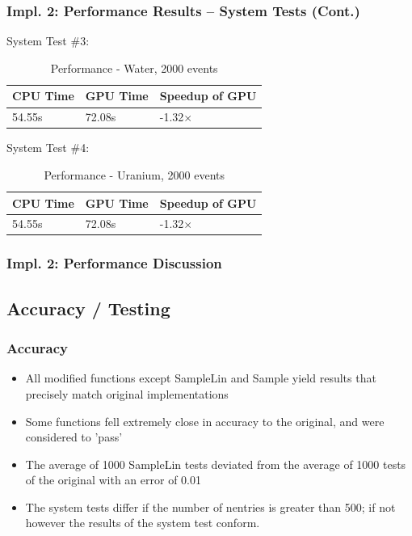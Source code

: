 \documentclass{beamer}
\begin{document}
\begin{frame}
\frametitle{Impl. 2: Performance Results -- System Tests (Cont.)}
System Test \#3:
\begin{table}
	\begin{tabular}{lll}
	\toprule
	\bf CPU Time&\bf  GPU Time&\bf Speedup of GPU\\\midrule
	54.55s&72.08s&-1.32$\times$\\\bottomrule
	\end{tabular}
	\caption{Performance - Water, 2000 events}
\end{table}
System Test \#4:
\begin{table}
	\begin{tabular}{lll}
	\toprule
	\bf CPU Time&\bf  GPU Time&\bf Speedup of GPU\\\midrule
	54.55s&72.08s&-1.32$\times$\\\bottomrule
	\end{tabular}
	\caption{Performance - Uranium, 2000 events}
\end{table}
\end{frame}

\begin{frame}
\frametitle{Impl. 2: Performance Discussion}
\end{frame}

\subsection{Accuracy / Testing}
\begin{frame}
\frametitle{Accuracy}
\begin{itemize}
\item All modified functions except SampleLin and Sample
yield results that precisely match original implementations
\end{itemize}
\begin{itemize}
\item Some functions fell extremely close in accuracy to 
the original, and were considered to 'pass'
\item The average of 1000 SampleLin tests deviated from the 
average of 1000 tests of the original with an error of 0.01 
\end{itemize}
\begin{itemize}
\item The system tests differ if the number of nentries is 
greater than 500; if not however the results of the system 
test conform.
\end{itemize}
\end{frame}
\end{document}
